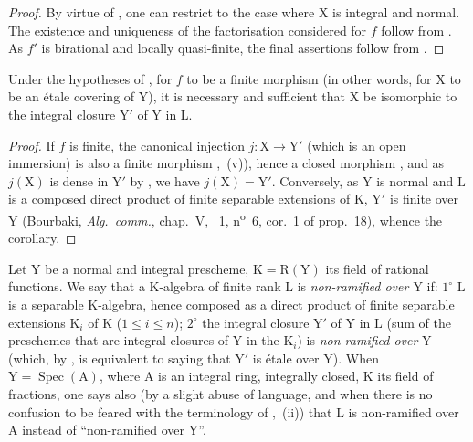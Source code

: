 \begin{proof}
By virtue of , one can restrict to the case where $\mathrm{X}$ is integral and normal.
The existence and uniqueness of the factorisation considered for $f$ follow from .
As $f'$ is birational and locally quasi-finite, the final assertions follow from .
\end{proof}

\begin{corollary}[18.10.9]
\label{IV.18.10.9}
Under the hypotheses of , for $f$ to be a finite morphism (in other words, for $\mathrm{X}$ to be an \'etale covering of $\mathrm{Y}$), it is necessary and sufficient that $\mathrm{X}$ be isomorphic to the integral closure $\mathrm{Y}'$ of $\mathrm{Y}$ in $\mathrm{L}$.
\end{corollary}

\begin{proof}
If $f$ is finite, the canonical injection $j:\mathrm{X}\to\mathrm{Y}'$ (which is an open immersion) is also a finite morphism ,~(v)), hence a closed morphism , and as $j(\mathrm{X})$ is dense in $\mathrm{Y}'$ by , we have $j(\mathrm{X})=\mathrm{Y}'$.
Conversely, as $\mathrm{Y}$ is normal and $\mathrm{L}$ is a composed direct product of finite separable extensions of $\mathrm{K}$, $\mathrm{Y}'$ is finite over $\mathrm{Y}$ (Bourbaki, \emph{Alg.\ comm.}, chap.~V, \textsection~1, n\textsuperscript{o}~6, cor.~1 of prop.~18), whence the corollary.
\end{proof}

\begin{env}[18.10.10]
\label{IV.18.10.10}
Let $\mathrm{Y}$ be a normal and integral prescheme, $\mathrm{K}=\mathrm{R}(\mathrm{Y})$ its field of rational functions.
We say that a $\mathrm{K}$-algebra of finite rank $\mathrm{L}$ is \emph{non-ramified over $\mathrm{Y}$} if: $1^{\circ}$ $\mathrm{L}$ is a separable $\mathrm{K}$-algebra, hence composed as a direct product of finite separable extensions $\mathrm{K}_i$ of $\mathrm{K}$ ($1\leq i\leq n$); $2^{\circ}$ the integral closure $\mathrm{Y}'$ of $\mathrm{Y}$ in $\mathrm{L}$ (sum of the preschemes that are integral closures of $\mathrm{Y}$ in the $\mathrm{K}_i$) is \emph{non-ramified over} $\mathrm{Y}$ (which, by ,
is equivalent to saying that $\mathrm{Y}'$ is \'etale over $\mathrm{Y}$).
When $\mathrm{Y}=\operatorname{Spec}(\mathrm{A})$, where $\mathrm{A}$ is an integral ring, integrally closed, $\mathrm{K}$ its field of fractions, one says also (by a slight abuse of language, and when there is no confusion to be feared with the terminology of ,~(ii)) that $\mathrm{L}$ is non-ramified over $\mathrm{A}$ instead of ``non-ramified over $\mathrm{Y}$''.
\end{env}

